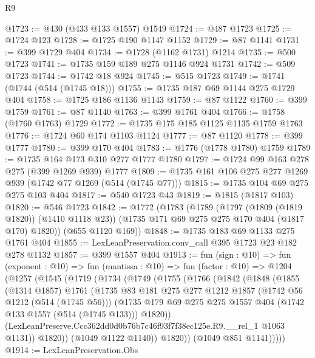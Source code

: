 \begin{lexlean}{R9}
\begin{coremodule}
@1723 := @430 (@433 @133 @1557) @1549
@1724 := @487 @1723
@1725 := @1724 @123
@1728 := @1725 @190 @1147 @1152
@1729 := @87 @1141
@1731 := @399 @1729 @404
@1734 := @1728 (@1162 @1731) @1214
@1735 := @500 @1723
@1741 := @1735 @159 @189 @275 @1146 @924 @1731
@1742 := @509 @1723
@1744 := @1742 @18 @924
@1745 := @515 @1723
@1749 := @1741 (@1744 (@514 (@1745 @18)))
@1755 := @1735 @187 @69 @1144 @275 @1729 @404
@1758 := @1725 @186 @1136 @1143
@1759 := @87 @1122
@1760 := @399 @1759
@1761 := @87 @1140
@1763 := @399 @1761 @404
@1766 := @1758 (@1760 @1763) @1729
@1772 := @1735 @175 @185 @1125 @1135 @1759 @1763
@1776 := @1724 @60 @174 @1103 @1124
@1777 := @87 @1120
@1778 := @399 @1777
@1780 := @399 @170 @404
@1783 := @1776 (@1778 @1780) @1759
@1789 := @1735 @164 @173 @310 @277 @1777 @1780
@1797 := @1724 @99 @163 @278 @275 (@399 @1269 @939) @1777
@1809 := @1735 @161 @106 @275 @277 @1269 @939 (@1742 @77 @1269 (@514 (@1745 @77)))
@1815 := @1735 @104 @69 @275 @275 @103 @404
@1817 := @540 @1723 @43
@1819 := @1815 (@1817 @103)
@1820 := @546 @1723
@1842 := @1772
    (@1783
      (@1789
        (@1797 (@1809 (@1819 @1820)) (@1410 @1118 @23))
        (@1735 @171 @69 @275 @275 @170 @404 (@1817 @170) @1820))
      (@655 @1120 @169))
@1848 := @1735 @183 @69 @1133 @275 @1761 @404
@1855 := LexLeanPreservation.conv_call @395 @1723 @23 @182 @278 @1132
@1857 := @399 @1557 @404
@1913 := fun (sign : @10) =>
  fun (exponent : @10) =>
  fun (mantissa : @10) =>
  fun (factor : @10) =>
  @1204
    (@1257
      (@1545
        (@1719
          (@1734
            (@1749
              (@1755
                (@1766
                  (@1842
                    (@1848
                      (@1855
                        (@1314 @1857)
                        @1761
                        (@1735
                          @83
                          @181
                          @275
                          @277
                          @1212
                          @1857
                          (@1742 @56 @1212 (@514 (@1745 @56)))
                          (@1735
                            @179
                            @69
                            @275
                            @275
                            @1557
                            @404
                            (@1742 @133 @1557 (@514 (@1745 @133)))
                            @1820))
                        (LexLeanPreserve.Ccc362dd0d0b76b7c46f93f7f38ec125e.R9.__rel_1 @1063 @1131))
                      @1820))
                  (@1049 @1122 @1140))
                @1820))
            (@1049 @851 @1141)))))
@1914 := LexLeanPreservation.Obs

\end{coremodule}
\end{lexlean}
